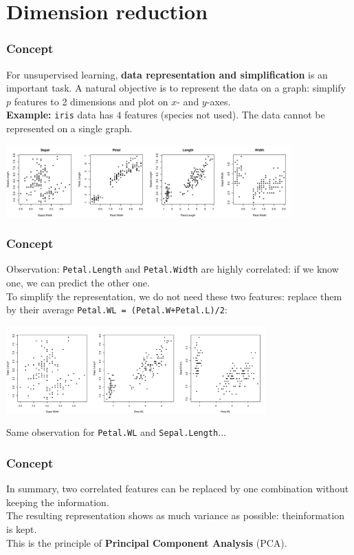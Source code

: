 \section{Dimension reduction}
\begin{frame}
\frametitle{Concept}
For unsupervised learning, {\bf data representation and simplification} is an important task. A natural objective is to represent the data on a graph: simplify $p$ features to 2 dimensions and plot on $x$- and $y$-axes. \\
\vspace{0.2cm}
{\bf Example:} {\tt iris} data has $4$ features (species not used). The data cannot be represented on a single graph.
\begin{center}
\includegraphics[width=11cm]{../../Graphs/Iris_raw.png}
\end{center} 
\end{frame}
\begin{frame}
\frametitle{Concept}
Observation: {\tt Petal.Length} and {\tt Petal.Width} are highly correlated: if we know one, we can predict the other one.\\
\vspace{0.3cm}
To simplify the representation, we do not need these two features: replace them by their average {\tt Petal.WL = (Petal.W+Petal.L)/2}:
\begin{center}
\includegraphics[width=10cm]{../../Graphs/Iris_raw2.png}
\end{center} 
Same observation for {\tt Petal.WL} and {\tt Sepal.Length}...
\end{frame}
\begin{frame}
\frametitle{Concept}
In summary, two correlated features can be replaced by one combination without keeping the information. \\
\vspace{0.3cm}
The resulting representation shows as much variance as possible: theinformation is kept.\\
\vspace{0.3cm}
This is the principle of {\bf Principal Component Analysis} (PCA).
\end{frame}
